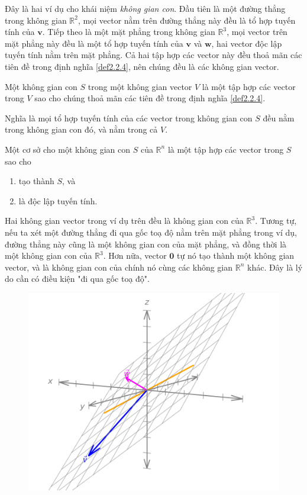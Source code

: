 Đây là hai ví dụ cho khái niệm \emph{không gian con}. Đầu tiên là một đường thẳng trong không gian \(\mathbb{R}^2\), 
mọi vector nằm trên đường thẳng này đều là tổ hợp tuyến tính của \(\mathbf{v}\). Tiếp theo là một mặt phẳng trong không gian \(\mathbb{R}^3\),
mọi vector trên mặt phẳng này đều là một tổ hợp tuyến tính của \(\mathbf{v}\) và \(\mathbf{w}\), hai vector độc lập tuyến tính nằm trên mặt phẳng.
Cả hai tập hợp các vector này đều thoả mãn các tiên đề trong định nghĩa \ref{def2.2.4}, nên chúng đều là các không gian vector. 

\begin{definition}
Một không gian con \(S\) trong một không gian vector \(V\) là một tập hợp các vector trong \(V\) sao cho chúng thoả mãn các tiên đề trong định nghĩa \ref{def2.2.4}.
\end{definition}

Nghĩa là mọi tổ hợp tuyến tính của các vector trong không gian con \(S\) đều nằm trong không gian con đó, và nằm trong cả \(V\).
\begin{definition}
    Một cơ sở cho một không gian con \(S\) của \(\mathbb{R}^n\) là một tập hợp các vector trong \(S\) sao cho 
    \begin{enumerate}
        \item tạo thành \(S\), và
        \item là độc lập tuyến tính.
    \end{enumerate}
\end{definition}
Hai không gian vector trong ví dụ trên đều là không gian con của \(\mathbb{R}^3\). Tương tự, nếu ta xét một đường thẳng đi qua gốc toạ độ nằm trên mặt phẳng trong ví dụ, đường thẳng này cũng là một không gian con của mặt phẳng, và đồng thời là một không gian con của \(\mathbb{R}^3\).
Hơn nữa, vector \(\mathbf{0}\) tự nó tạo thành một không gian vector, và là không gian con của chính nó cùng các không gian \(\mathbb{R}^n\) khác. Đây là lý do cần có điều kiện "đi qua gốc toạ độ".
\begin{figure}[H]
    \centering
    \includegraphics[width=0.6\linewidth]{Tuan2/Figures/lineonplaneinspace.png}
\end{figure}

